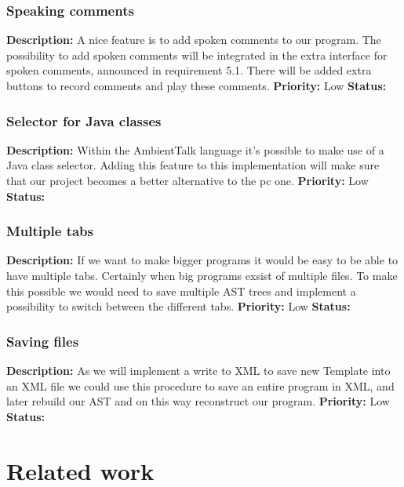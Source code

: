 \documentclass[a4paper,12pt]{report}
\begin{document}
\subsection{Speaking comments}
\textbf{Description: } A nice feature is to add spoken comments to our program. The possibility to add spoken comments will be integrated in the
extra interface for spoken comments, announced in requirement 5.1. There will be added extra buttons to record comments and play these comments.\newline
\textbf{Priority:} Low \newline
\textbf{Status: } \newline
\subsection{Selector for Java classes}
\textbf{Description: } Within the AmbientTalk language it's possible to make use of a Java class selector. Adding this feature to this implementation
will make sure that our project becomes a better alternative to the pc one.\newline
\textbf{Priority:} Low \newline
\textbf{Status: } \newline
\subsection{Multiple tabs}
\textbf{Description: } If we want to make bigger programs it would be easy to be able to have multiple tabs. Certainly when big programs exsist of multiple files. To make this possible we would need
to save multiple AST trees and implement a possibility to switch between the different tabs.\newline
\textbf{Priority:} Low \newline
\textbf{Status: }
\subsection{Saving files}
\textbf{Description: } As we will implement a write to XML to save new Template into an XML file we could use this procedure to save an entire program in XML, and later rebuild our AST and on this way 
reconstruct our program. \newline
\textbf{Priority:} Low \newline
\textbf{Status: }
\chapter{Related work}
\end{document}
